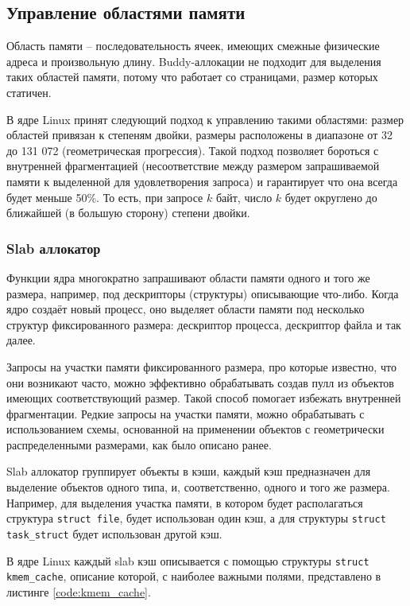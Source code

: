 \subsection{Управление областями памяти}

Область памяти -- последовательность ячеек, имеющих смежные физические адреса и произвольную длину. Buddy-аллокации не подходит для выделения таких областей памяти, потому что работает со страницами, размер которых статичен. 

В ядре Linux принят следующий подход к управлению такими областями: размер областей привязан к степеням двойки, размеры расположены в диапазоне от 32 до 131 072 (геометрическая прогрессия). Такой подход позволяет бороться с внутренней фрагментацией (несоответствие между размером запрашиваемой памяти к выделенной для удовлетворения запроса) и гарантирует что она всегда будет меньше 50\%. То есть, при запросе $k$ байт, число $k$ будет округлено до ближайшей (в большую сторону) степени двойки.

\subsubsection{Slab аллокатор}

Функции ядра многократно запрашивают области памяти одного и того же размера, например, под дескрипторы (структуры) описывающие что-либо. Когда ядро создаёт новый процесс, оно выделяет области памяти под несколько структур фиксированного размера: дескриптор процесса, дескриптор файла и так далее. 

Запросы на участки памяти фиксированного размера, про которые известно, что они возникают часто, можно эффективно обрабатывать создав пулл из объектов имеющих соответствующий размер. Такой способ помогает избежать внутренней фрагментации. Редкие запросы на участки памяти, можно обрабатывать с использованием схемы, основанной на применении объектов с геометрически распределенными размерами, как было описано ранее.

Slab аллокатор группирует объекты в кэши, каждый кэш предназначен для выделение объектов одного типа, и, соответственно, одного и того же размера. Например, для выделения участка памяти, в котором будет располагаться структура \texttt{struct file}, будет использован один кэш, а для структуры \texttt{struct task\_struct} будет использован другой кэш.

В ядре Linux каждый slab кэш описывается с помощью структуры \texttt{struct kmem\_cache}, описание которой, с наиболее важными полями, представлено в листинге \ref{code:kmem_cache}.

